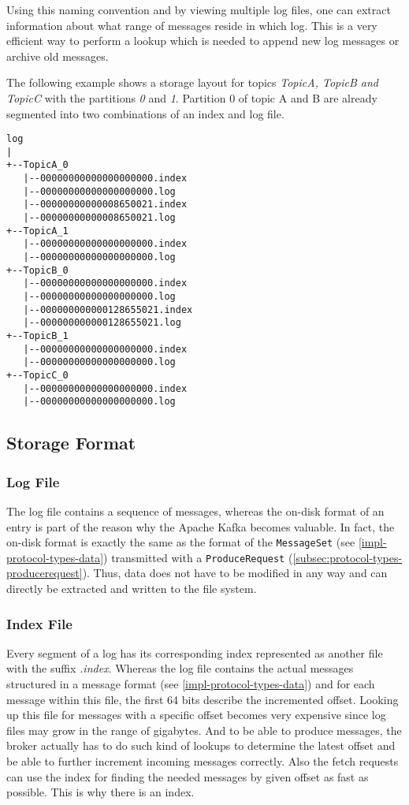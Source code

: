 Using this naming convention and by viewing multiple log files, one can extract
information about what range of messages reside in which log. This is a very
efficient way to perform a lookup which is needed to append new log messages or
archive old messages.

The following example shows a storage layout for topics \textit{TopicA, TopicB
and TopicC} with the partitions \textit{0} and \textit{1}. Partition 0 of topic
A and B are already segmented into two combinations of an index and log file.

\begin{verbatim}
log
|
+--TopicA_0
   |--00000000000000000000.index
   |--00000000000000000000.log
   |--00000000000008650021.index
   |--00000000000008650021.log
+--TopicA_1
   |--00000000000000000000.index
   |--00000000000000000000.log
+--TopicB_0
   |--00000000000000000000.index
   |--00000000000000000000.log
   |--000000000000128655021.index
   |--000000000000128655021.log
+--TopicB_1
   |--00000000000000000000.index
   |--00000000000000000000.log
+--TopicC_0
   |--00000000000000000000.index
   |--00000000000000000000.log
\end{verbatim}

\subsection{Storage Format}
\subsubsection{Log File}

The log file contains a sequence of messages, whereas the on-disk format of an
entry is part of the reason why the Apache Kafka becomes valuable. In fact, the
on-disk format is exactly the same as the format of the \lstinline{MessageSet}
(see \ref{impl-protocol-types-data}) transmitted with a
\lstinline{ProduceRequest} (\ref{subsec:protocol-types-producerequest}). Thus,
data does not have to be modified in any way and can directly be extracted and
written to the file system.

\subsubsection{Index File}

Every segment of a log has its corresponding index represented as another file with
the suffix \textit{.index}. Whereas the log file contains the actual messages
structured in a message format (see \ref{impl-protocol-types-data}) and for each
message within this file, the first 64 bits describe the incremented offset.
Looking up this file for messages with a specific offset becomes very expensive
since log files may grow in the range of gigabytes. And to be able to produce
messages, the broker actually has to do such kind of lookups to determine the
latest offset and be able to further increment incoming messages correctly.
Also the fetch requests can use the index for finding the needed messages by
given offset as fast as possible. This is why there is an index.

